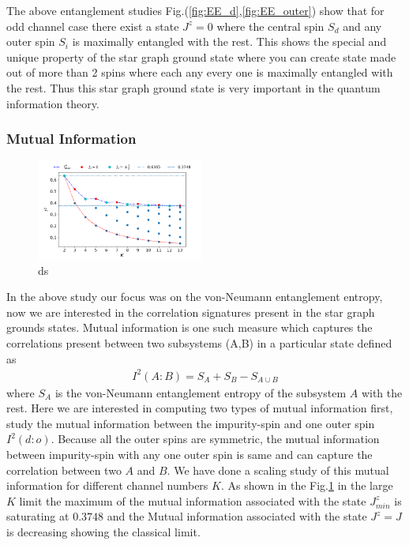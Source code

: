 \documentclass[reprint,prb,superscriptaddress]{revtex4-2}
\begin{document}
\par The above entanglement studies Fig.(\ref{fig:EE_d},\ref{fig:EE_outer}) show  that for odd channel case there exist a state $J^z=0$ where the central spin $S_d$ and any outer spin $S_i$ is maximally entangled with the rest. This shows the special and unique property of the star graph ground state where you can create state made out of more than 2 spins where each any every one is maximally entangled with the rest. Thus this star graph ground state is very important in the quantum information theory. 

\subsubsection{Mutual Information}

\begin{figure}[!htpb]
\includegraphics[width=0.49\textwidth]{plt/NEW31Dec_I_2_vs_Nch_[0,1]}
\caption{ds}
\label{fig:MI_d_o}
\end{figure}
\noindent In the above study our focus was on the von-Neumann entanglement entropy, now we are interested in the correlation signatures present in the star graph grounds states. Mutual information is one such measure which captures the correlations present between two subsystems (A,B) in a particular state defined as
\begin{eqnarray}
I^2(A:B)=S_A+S_B-S_{A\cup B}
\end{eqnarray}
where $S_{A}$ is the von-Neumann entanglement entropy of the subsystem $A$ with the rest. Here we are interested in computing two types of mutual information first, study the mutual information between the impurity-spin and one outer spin $I^2(d:o)$. Because all the outer spins are symmetric, the mutual information between impurity-spin with any one outer spin is same and can capture the correlation between two $A$ and $B$. We have done a scaling study of this mutual information for different channel numbers $K$. As shown in the Fig.\ref{fig:MI_d_o} in the large $K$ limit the maximum of the mutual information associated with the state $J^z_{min}$ is saturating at $0.3748$ and the Mutual information associated with the state $J^z=J$ is decreasing showing the classical limit.
\end{document}
